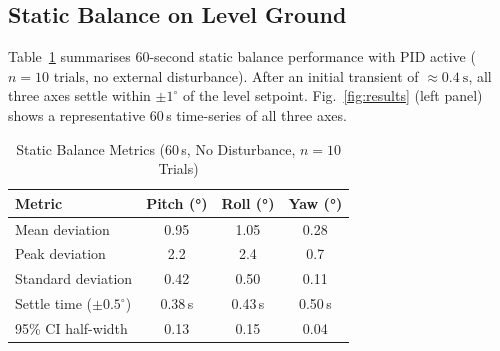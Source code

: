 \documentclass[journal]{IEEEtran}
\newcommand{\dg}{^{\circ}}
\begin{document}
\subsection{Static Balance on Level Ground}
\label{subsec:static}
Table~\ref{tab:static} summarises 60-second static balance
performance with PID active ($n=10$ trials, no external
disturbance).
After an initial transient of $\approx\SI{0.4}{\second}$,
all three axes settle within $\pm1\dg$ of the level setpoint.
Fig.~\ref{fig:results} (left panel) shows a representative
60\,s time-series of all three axes.
\begin{table}[!t]
\caption{Static Balance Metrics (60\,s, No Disturbance, $n=10$ Trials)}
\label{tab:static}
\centering
\begin{tabular}{lccc}
\toprule
\textbf{Metric} & \textbf{Pitch (\si{\degree})} &
                  \textbf{Roll (\si{\degree})} &
                  \textbf{Yaw (\si{\degree})} \\
\midrule
Mean deviation             & 0.95 & 1.05 & 0.28 \\
Peak deviation             & 2.2  & 2.4  & 0.7  \\
Standard deviation         & 0.42 & 0.50 & 0.11 \\
Settle time ($\pm0.5\dg$) & 0.38\,s & 0.43\,s & 0.50\,s \\
95\% CI half-width         & 0.13 & 0.15 & 0.04 \\
\bottomrule
\end{tabular}
\end{table}
\end{document}
